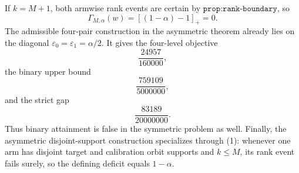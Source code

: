 If \(k=M+1\), both armwise rank events are certain by \(\texttt{prop:rank-boundary}\), so
\[
\Gamma_{M,\alpha}(w)=[(1-\alpha)-1]_+=0.
\tag{8}
\]
The admissible four-pair construction in the asymmetric theorem already lies on the diagonal \(\varepsilon_0=\varepsilon_1=\alpha/2\). It gives the four-level objective
\[
\frac{24957}{160000},
\]
the binary upper bound
\[
\frac{759109}{5000000},
\]
and the strict gap
\[
\frac{83189}{20000000}.
\]
Thus binary attainment is false in the symmetric problem as well. Finally, the asymmetric disjoint-support construction specializes through (1): whenever one arm has disjoint target and calibration orbit supports and \(k\le M\), its rank event fails surely, so the defining deficit equals \(1-\alpha\).